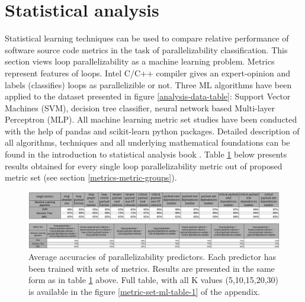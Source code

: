 \section{Statistical analysis}
\label{analysis-statistical-analysis}
\qquad Statistical learning techniques can be used to compare relative performance of software source code metrics in the task of parallelizability classification. This section views loop parallelizability as a machine learning problem. Metrics represent features of loops. Intel C/C++ compiler gives an expert-opinion and labels (classifies) loops as parallelizible or not. Three ML algorithms have been applied to the dataset presented in figure \ref{analysis-data-table}: Support Vector Machines (SVM), decision tree classifier, neural network based Multi-layer Perceptron (MLP). All machine learning metric set studies have been conducted with the help of pandas \cite{python-lib-pandas} and scikit-learn \cite{python-lib-scikit-learn} python packages. Detailed description of all algorithms, techniques and all underlying mathematical foundations can be found in the introduction to statistical analysis book \cite{statistical-learning-book}.\newline
\null\qquad Table \ref{single-metric-ml-table-0} below presents results obtained for every single loop parallelizability metric out of proposed metric set (see section \ref{metrics-metric-groups}).
\begin{figure}
\centering
\includegraphics[width=\linewidth]{figs/single-metric-ml-table-0.png}
\caption{Average accuracies of parallelizability predictors. Each predictor has been trained with only one feature (table columns). Different machine learning techniques (SVN, Decision Tree, MPL) have been used for training. Percentages in the table represent mean prediction accuracies. K-fold (K=15) cross validation technique has been used to partition samples from \ref{analysis-data-table} into training and testing sets. Different K numbers (5, 10, 20, 30) produce approximately the same mean accuracies (see figure \ref{single-metric-ml-table-1}) for the full set of K values.}
\label{metric-set-ml-table-0}
\includegraphics[width=\linewidth]{figs/metric-set-ml-table-0.png}
\caption{Average accuracies of parallelizability predictors. Each predictor has been trained with sets of metrics. Results are presented in the same form as in table \ref{single-metric-ml-table-0} above. Full table, with all K values (5,10,15,20,30) is available in the figure \ref{metric-set-ml-table-1} of the appendix.}
\label{single-metric-ml-table-0}
\end{figure}\newline 
